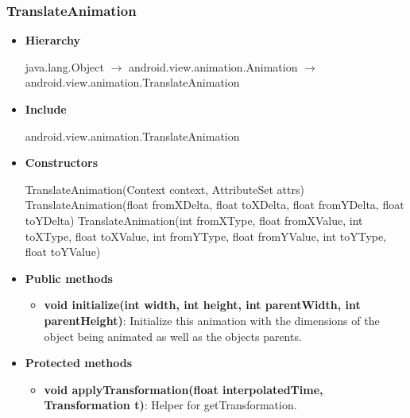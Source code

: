 \documentclass{report}
\begin{document}
    \subsubsection{TranslateAnimation}
    \begin{itemize}
        \item \textbf{Hierarchy}
            \begin{center}
                java.lang.Object $\to$	android.view.animation.Animation $\to$	android.view.animation.TranslateAnimation
            \end{center}
        \item \textbf{Include}
            \bigbreak \noindent 
            \begin{javacode}
                android.view.animation.TranslateAnimation
            \end{javacode}
        \item \textbf{Constructors}
            \bigbreak \noindent 
            \begin{javacode}
                TranslateAnimation(Context context, AttributeSet attrs)
                TranslateAnimation(float fromXDelta, float toXDelta, float fromYDelta, float toYDelta)
                TranslateAnimation(int fromXType, float fromXValue, int toXType, float toXValue, int fromYType, float fromYValue, int toYType, float toYValue)
            \end{javacode}
        \item \textbf{Public methods}
            \begin{itemize}
                \item \textbf{void	initialize(int width, int height, int parentWidth, int parentHeight)}: Initialize this animation with the dimensions of the object being animated as well as the objects parents.
            \end{itemize}
        \item \textbf{Protected methods}
            \begin{itemize}
                \item \textbf{void	applyTransformation(float interpolatedTime, Transformation t)}: Helper for getTransformation.
            \end{itemize}

    \end{itemize}

    \pagebreak 
\end{document}
